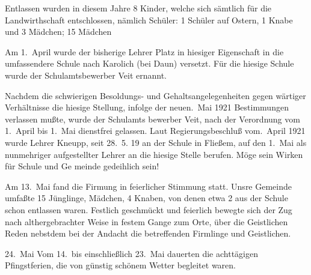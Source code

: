 

\pstart
Entlassen wurden in diesem Jahre 8 Kinder, welche sich sämtlich für\ob
die Landwirthschaft entschlossen, nämlich Schüler\unsicher: 1\ob
Schüler auf Ostern\unsicher, 1 Knabe und 3 Mädchen; 15 Mädchen\unsicher

\pend
{}
\pstart

Am 1.\ April wurde der bisherige Lehrer Platz in\ob
hiesiger Eigenschaft in die umfassendere Schule nach\ob
Karolich\unsicher{} (bei Daun) versetzt.  Für die hiesige\ob
Schule wurde der Schulamtsbewerber Veit ernannt.

Nachdem die schwierigen Besoldungs- und Gehaltsangelegenheiten gegen\ohb
wärtiger Verhältnisse die hiesige Stellung, infolge der neuen.\ Mai 1921  Bestimmungen verlassen mußte, wurde der Schulamts\ohb
bewerber Veit, nach der Verordnung vom 1.\ April\ob
bis 1.\ Mai dienstfrei gelassen. Laut Regierungsbeschluß vom.\ April 1921 wurde Lehrer Kneupp, seit 28.\ 5. 19\unsicher{} an\ob
der Schule in Fließem\unsicher, auf den 1.\ Mai als nunmehriger\ob
aufgestellter Lehrer an die hiesige Stelle berufen.\ob
Möge sein Wirken\unsicher{} für Schule und Ge\ohb
meinde gedeihlich sein!

Am 13.\ Mai fand die Firmung in feierlicher Stimmung statt.\ob
Unsre Gemeinde umfaßte 15 Jünglinge, Mädchen, 4 Knaben\unsicher, von denen etwa 2 aus der\ob
Schule schon entlassen waren. Festlich geschmückt\ob
und feierlich bewegte sich der Zug nach althergebrachter Weise\unsicher\ob
in festem Gange zum Orte, über die Geistlichen\ob
Reden nebstdem bei der Andacht die betreffenden\ob
Firmlinge und Geistlichen\unsicher.

24.\ Mai  Vom 14.\ bis einschließlich 23.\ Mai dauerten\ob
die achttägigen Pfingstferien, die von günstig\ob
schönem Wetter begleitet waren.
\pend

